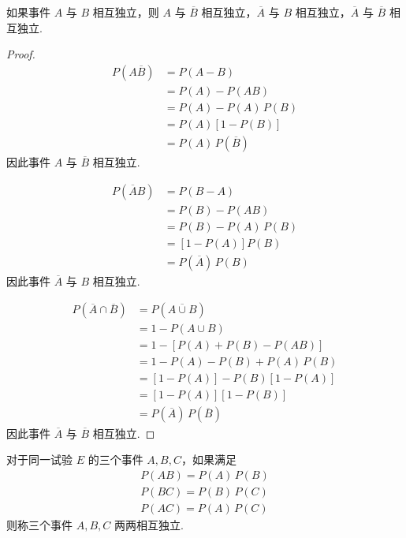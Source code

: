 \vspace{0.5em}

\begin{conclusion}
    \indent 如果事件 $A$ 与 $B$ 相互独立，则 $A$ 与 $\overline{B}$ 相互独立，$\overline{A}$ 与 $B$ 相互独立，$\overline{A}$ 与 $\overline{B}$ 相互独立.
\end{conclusion}

\begin{proof}
    $$
    \begin{aligned}
        P(A \overline{B}) &= P(A-B) \\
        &= P(A) - P(AB) \\
        &= P(A) - P(A) \, P(B)\\
        &= P(A)[1-P(B)]\\
        &= P(A) \, P(\overline{B})
    \end{aligned}
    $$
    因此事件 $A$ 与 $\overline{B}$ 相互独立.

    $$
    \begin{aligned}
        P(\overline{A} B) &= P(B-A) \\
        &= P(B) - P(AB) \\
        &= P(B) - P(A) \, P(B) \\
        &= [1-P(A)] P(B) \\
        &= P(\overline{A}) \, P(B)
    \end{aligned}
    $$
    因此事件 $\overline{A}$ 与 $B$ 相互独立.

    $$
    \begin{aligned}
        P(\overline{A} \cap \overline{B}) &= P(\overline{A \cup B}) \\
        &= 1 - P(A \cup B) \\
        &= 1 - [P(A) + P(B) - P(AB)] \\
        &= 1 - P(A) - P(B) + P(A) \, P(B) \\
        &= [1-P(A)] - P(B) [1-P(A)] \\
        &= [1-P(A)][1-P(B)] \\
        &= P(\overline{A}) \, P(\overline{B})
    \end{aligned}
    $$
    因此事件 $\overline{A}$ 与 $\overline{B}$ 相互独立.
\end{proof}

\begin{definition}
    \indent 对于同一试验 $E$ 的三个事件 $A,B,C$，如果满足
    \begin{gather*}
        P(AB) = P(A) \, P(B) \\
        P(BC) = P(B) \, P(C) \\
        P(AC) = P(A) \, P(C)
    \end{gather*}
    则称三个事件 $A,B,C$ {\heiti 两两相互独立}.
\end{definition}

